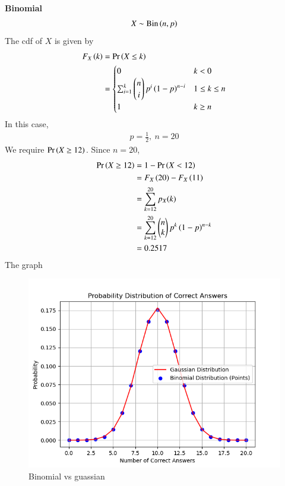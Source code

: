 \documentclass[journal,12pt,twocolumn]{IEEEtran}
\theoremstyle{remark}
\begin{document}
\textbf{Binomial}
\begin{align}
   X \sim \textrm{Bin}\left(n,p\right)
\end{align}
The cdf of $X$ is given by
\begin{align}
F_X\left(k\right) &= \Pr\left(X \le k\right) \\
        &=
\begin{cases}
0 & k < 0 \\
\sum_{i=1}^{k}\begin{pmatrix}n\\i\end{pmatrix}p^i\left(1-p\right)^{n-i} & 1 \le k \le n \\
1 & k \ge n
\end{cases}
\label{eq:cdf-Y}
\end{align}
In this case,
\begin{align}
p = \frac{1}{2},\ n = 20
\end{align}
We require $\Pr\left(X\ge12\right)$. Since $n = 20$,
\begin{align}
\Pr\left(X\ge12\right) &= 1 - \Pr\left(X<12\right) \\
&= F_X\left(20\right) - F_X\left(11\right) \\
&= \sum_{k=12}^{20}p_X(k) \\
&= \sum_{k=12}^{20}\begin{pmatrix}n\\k\end{pmatrix}p^k\left(1-p\right)^{n-k} \\
&= 0.2517
\end{align}
The graph\\
\begin{figure}[h]
\includegraphics[width=\columnwidth]{./figs/dist.png}
\caption{Binomial vs guassian}
\label{fig:BvG_py}
\end{figure}
\end{document}
